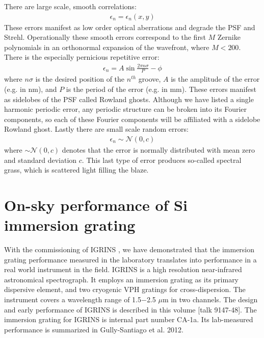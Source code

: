 There are large scale, smooth correlations:
\begin{eqnarray}
\epsilon_n = \epsilon_n(x, y) \label{eqn:smooth}
\end{eqnarray}
These errors manifest as low order optical aberrations and degrade the PSF and Strehl.  Operationally these smooth errors correspond to the first $M$ Zernike polynomials in an orthonormal expansion of the wavefront, where $M < 200$.  There is the especially pernicious repetitive error:
\begin{eqnarray}
\epsilon_n = A\sin{\frac{2\pi n\sigma}{P} - \phi} \label{eqn:Periodic}
\end{eqnarray}
where $n\sigma$ is the desired position of the $n^{th}$ groove, $A$ is the amplitude of the error (e.g. in nm), and $P$ is the period of the error (e.g. in mm).  These errors manifest as sidelobes of the PSF called Rowland ghosts.  Although we have listed a single harmonic periodic error, any periodic structure can be broken into its Fourier components, so each of these Fourier components will be affiliated with a sidelobe Rowland ghost.  Lastly there are small scale random errors:
\begin{eqnarray}
\epsilon_n \sim \mathcal{N}(0, c)
\end{eqnarray}
where $ \sim \mathcal{N}(0, c)$ denotes that the error is normally distributed with mean zero and standard deviation $c$.  This last type of error produces so-called spectral grass\cite{2007ApOpt..46.3400M}, which is scattered light filling the blaze.

\section{On-sky performance of Si immersion grating}

With the commissioning of IGRINS \cite{2010SPIE.7735E..54Y}, we have demonstrated that the immersion grating performance measured in the laboratory translates into performance in a real world instrument in the field.  IGRINS is a high resolution near-infrared astronomical spectrograph.  It employs an immersion grating as its primary dispersive element, and two cryogenic VPH gratings for cross-dispersion.  The instrument covers a wavelength range of 1.5$-$2.5 $\mu$m in two channels.  The design and early performance of IGRINS is described in this volume [talk 9147-48]\cite{2014SPIE.CHANPARK.IGRINS}.  The immersion grating for IGRINS is internal part number CA-1a.  Its lab-measured performance is summarized in Gully-Santiago et al. 2012\cite{2012SPIE.8450E..2SG}.

